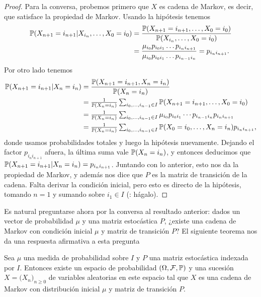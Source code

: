 \begin{proof}
Para la conversa, probemos primero que $X$ es cadena de Markov, es decir, que satisface la propiedad de Markov.
Usando la hipótesis tenemos
\begin{align}
\mathbb{P}(X_{n+1}=i_{n+1}|X_{i_n},\dotsc,X_0=i_0)&=\frac{\mathbb{P}(X_{n+1}=i_{n+1},\dotsc,X_0=i_0)}{\mathbb{P}(X_{i_n},\dotsc,X_0=i_0)}\\
&=\frac{\mu_{i_0}p_{i_0i_1}\dotsc p_{i_{n}i_{n+1}}}{\mu_{i_0}p_{i_0i_1}\dotsc p_{i_{n-1}i_n}}=p_{i_{n}i_{n+1}}.
\end{align}
Por otro lado tenemos
\begin{align}
\mathbb{P}(X_{n+1}=i_{n+1}|X_n=i_n)&=\frac{\mathbb{P}(X_{n+1}=i_{n+1},X_n=i_n)}{\mathbb{P}(X_n=i_n)}\\
&\textstyle=\frac1{\mathbb{P}(X_n=i_n)}\sum_{i_0,\dotsc,i_{n-1}\in I}\mathbb{P}(X_{n+1}=i_{n+1},\dotsc,X_0=i_0)\\
&\textstyle=\frac1{\mathbb{P}(X_n=i_n)}\sum_{i_0,\dotsc,i_{n-1}\in I}\mu_{i_0}p_{i_0i_1}\dotsm p_{i_{n-1}i_{n}}p_{i_{n}i_{n+1}}\\&
\textstyle=\frac1{\mathbb{P}(X_n=i_n)}\sum_{i_0,\dotsc,i_{n-1}\in I}\mathbb{P}(X_0=i_0,\dotsc,X_{n}=i_{n})p_{i_{n}i_{n+1}},
\end{align}
donde usamos probabilidades totales y luego la hipótesis nuevamente.
Dejando el factor $p_{i_{n}i_{n+1}}$ afuera, la última suma vale $\mathbb{P}(X_n=i_n)$, y entonces deducimos que $\mathbb{P}(X_{n+1}=i_{n+1}|X_n=i_n)=p_{i_{n}i_{n+1}}$.
Juntando con lo anterior, esto nos da la propiedad de Markov, y además nos dice que $P$ es la matriz de transición de la cadena.
Falta derivar la condición inicial, pero esto es directo de la hipótesis, tomando $n=1$ y sumando sobre $i_1\in I$ (\uexers: hágalo).
\end{proof}

Es natural preguntarse ahora por la conversa al resultado anterior: dados un vector de probabilidad $\mu$ y una matriz estocástica $P$, ¿existe una cadena de Markov con condición inicial $\mu$ y matriz de transición $P$? El siguiente teorema nos da una respuesta afirmativa a esta pregunta

\begin{thm}
Sea $\mu$ una medida de probabilidad sobre $I$ y $P$ una matriz estocástica indexada por $I$.
Entonces existe un espacio de probabilidad $(\Omega,\mathcal{F},\mathbb{P})$ y una sucesión $X=\big(X_n\big)_{n\geq0}$ de variables aleatorias en este espacio tal que $X$ es una cadena de Markov con distribución inicial $\mu$ y matriz de transición $P$.
\end{thm}

